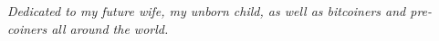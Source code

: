 
\newpage \vspace*{8cm}
\thispagestyle{empty}
\begin{center}
  \Large \emph{
  Dedicated to my future wife, my unborn child, as well as bitcoiners and pre-coiners all around the world.
  }
\end{center}
